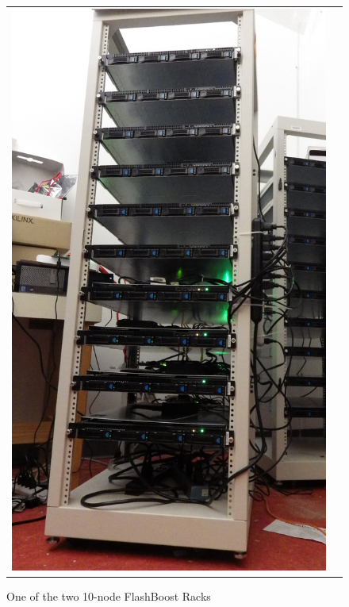 \begin{figure}[ht!]
	\begin{tabular}{cc}

	\multirow{2}{*}{
	\begin{minipage}[c]{.20\textwidth}
	\includegraphics[width=\textwidth]{figures/rackserver2.jpg}
	\caption{One of the two 10-node FlashBoost Racks}
	\label{fig:bluedbmcluster}
	\end{minipage}
	}
	& 
	\begin{minipage}[c]{.20\textwidth}

\end{minipage}
\end{tabular}
\end{figure}

